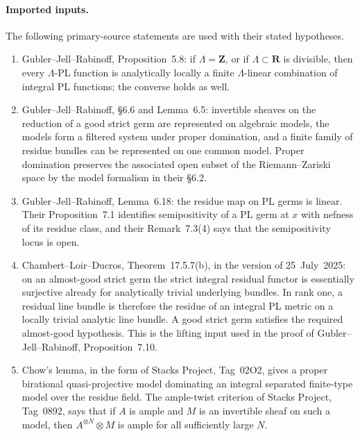 
\paragraph{Imported inputs.}
The following primary-source statements are used with their stated
hypotheses.
\begin{enumerate}
\item Gubler--Jell--Rabinoff, Proposition~5.8: if
\(\Lambda=\mathbf Z\), or if \(\Lambda\subset\mathbf R\) is divisible,
then every \(\Lambda\)-PL function is analytically locally a finite
\(\Lambda\)-linear combination of integral PL functions; the converse
holds as well.
\item Gubler--Jell--Rabinoff, \S6.6 and Lemma~6.5: invertible sheaves on
the reduction of a good strict germ are represented on algebraic models,
the models form a filtered system under proper domination, and a finite
family of residue bundles can be represented on one common model.
Proper domination preserves the associated open subset of the
Riemann--Zariski space by the model formalism in their \S6.2.
\item Gubler--Jell--Rabinoff, Lemma~6.18: the residue map on PL germs is
linear.  Their Proposition~7.1 identifies semipositivity of a PL germ at
\(x\) with nefness of its residue class, and their Remark~7.3(4) says that
the semipositivity locus is open.
\item Chambert--Loir--Ducros, Theorem~17.5.7(b), in the version of
25~July~2025: on an almost-good strict germ the strict integral residual
functor is essentially surjective already for analytically trivial
underlying bundles.  In rank one, a residual line bundle is therefore the
residue of an integral PL metric on a locally trivial analytic line bundle.
A good strict germ satisfies the required almost-good hypothesis.  This is
the lifting input used in the proof of Gubler--Jell--Rabinoff,
Proposition~7.10.
\item Chow's lemma, in the form of Stacks Project, Tag~02O2, gives a
proper birational quasi-projective model dominating an integral separated
finite-type model over the residue field.  The ample-twist criterion of
Stacks Project, Tag~0892, says that if \(A\) is ample and \(M\) is an
invertible sheaf on such a model, then \(A^{\otimes N}\otimes M\) is ample
for all sufficiently large \(N\).
\end{enumerate}

